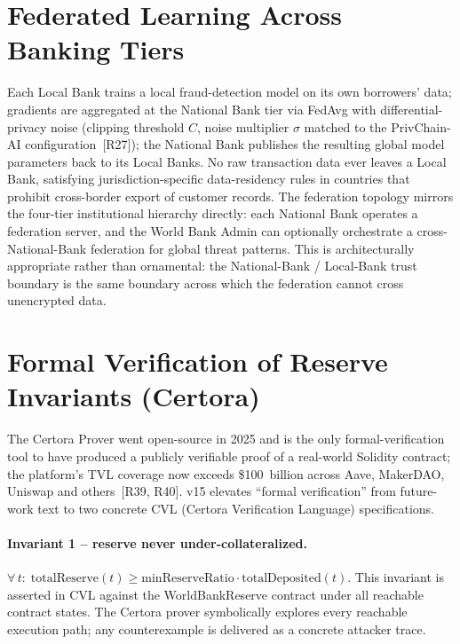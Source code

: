 \documentclass[12pt,a4paper]{report}
\begin{document}
\section{Federated Learning Across Banking Tiers}
\label{sec:fl-fraud}

Each Local Bank trains a local fraud-detection model on its own borrowers' data; gradients are aggregated at the National Bank tier via FedAvg with differential-privacy noise (clipping threshold $C$, noise multiplier $\sigma$ matched to the PrivChain-AI configuration~[R27]); the National Bank publishes the resulting global model parameters back to its Local Banks. No raw transaction data ever leaves a Local Bank, satisfying jurisdiction-specific data-residency rules in countries that prohibit cross-border export of customer records. The federation topology mirrors the four-tier institutional hierarchy directly: each National Bank operates a federation server, and the World Bank Admin can optionally orchestrate a cross-National-Bank federation for global threat patterns. This is architecturally appropriate rather than ornamental: the National-Bank / Local-Bank trust boundary is the same boundary across which the federation cannot cross unencrypted data.

\section{Formal Verification of Reserve Invariants (Certora)}
\label{sec:certora}

The Certora Prover went open-source in 2025 and is the only formal-verification tool to have produced a publicly verifiable proof of a real-world Solidity contract; the platform's TVL coverage now exceeds \$100~billion across Aave, MakerDAO, Uniswap and others~[R39, R40]. v15 elevates ``formal verification'' from future-work text to two concrete CVL (Certora Verification Language) specifications.

\paragraph{Invariant 1 -- reserve never under-collateralized.}
\(\forall\, t:\; \mathrm{totalReserve}(t) \ge \mathrm{minReserveRatio} \cdot \mathrm{totalDeposited}(t).\)
This invariant is asserted in CVL against the WorldBankReserve contract under all reachable contract states. The Certora prover symbolically explores every reachable execution path; any counterexample is delivered as a concrete attacker trace.
\end{document}
